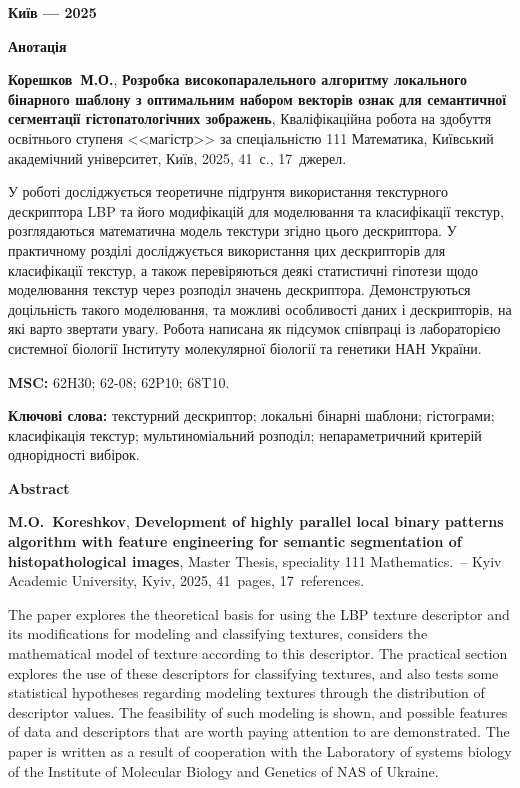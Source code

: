 \documentclass{thesis}
\newcommand{\MyInitialName}{Корешков~М.О.}
\newcommand{\ThesisName}{Розробка високопаралельного алгоритму локального бінарного шаблону з оптимальним набором векторів ознак для семантичної сегментації гістопатологічних зображень}
\newcommand{\NumPages}{41}
\newcommand{\NumCitations}{17}
\newcommand{\MyReverseInitialNameEn}{M.O.~Koreshkov}
\newcommand{\ThesisNameEn}{Development of highly parallel local binary patterns algorithm with feature engineering for semantic segmentation of histopathological images}
\newcommand{\MSC}{62H30; 62-08; 62P10; 68T10.}
\newcommand{\1}{\mathbb 1}
\begin{document}
\vfill

\centerline{\bf Київ --- 2025}

\newpage

\begin{center}
\Large \bf Анотація
\end{center}

\noindent
\textbf{\MyInitialName}, \textbf{\ThesisName}, Кваліфікаційна робота на здобуття освітнього ступеня <<магістр>> за спеціальністю 111 Математика, Київський академічний університет, Київ, 2025, \NumPages~с., \NumCitations~джерел.

\bigskip


{ У роботі досліджується теоретичне підґрунтя використання текстурного дескриптора LBP та його модифікацій для моделювання та класифікації текстур, 
розглядаються математична модель текстури згідно цього дескриптора.
У практичному розділі досліджується використання цих дескрипторів для класифікації текстур, 
а також перевіряються деякі статистичні гіпотези щодо моделювання текстур через розподіл значень дескриптора.
Демонструються доцільність такого моделювання, та можливі особливості даних і дескрипторів, на які варто звертати увагу.
Робота написана як підсумок співпраці із лабораторією системної біології Інституту молекулярної біології та генетики НАН України.}

\bigskip

\noindent
{\bf MSC:} \MSC

\bigskip

\noindent
{\bf Ключові слова:} текстурний дескриптор; локальні бінарні шаблони; гістограми; класифікація текстур; мультиноміальний розподіл; непараметричний критерій однорідності вибірок.
\bigskip

\newpage

\begin{center}
\Large \bf Abstract
\end{center}

\noindent
\textbf{\MyReverseInitialNameEn}, \textbf{\ThesisNameEn}, Master Thesis, speciality 111 Mathematics.~--
Kyiv Academic University, Kyiv, 2025, \NumPages~pages, \NumCitations~references.

\bigskip
{ The paper explores the theoretical basis for using the LBP texture descriptor and its modifications for modeling and classifying textures,
considers the mathematical model of texture according to this descriptor.
The practical section explores the use of these descriptors for classifying textures,
and also tests some statistical hypotheses regarding modeling textures through the distribution of descriptor values.
The feasibility of such modeling is shown, and possible features of data and descriptors that are worth paying attention to are demonstrated.
The paper is written as a result of cooperation with the Laboratory of systems biology of the Institute of Molecular Biology and Genetics of NAS of Ukraine.}
\end{document}

